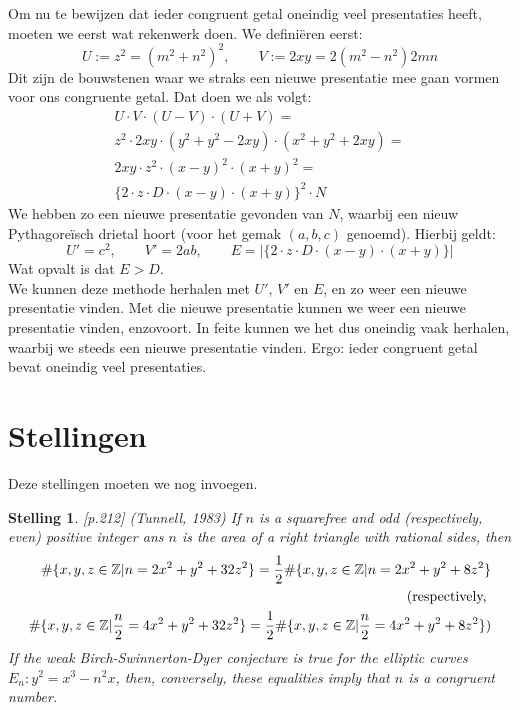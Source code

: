 \documentclass[12pt,reqno]{article}
\newcommand*{\ZZ}{\ensuremath{\mathbb{Z}}}
\theoremstyle{theorem}
\newtheorem{theorem}{Stelling}
\theoremstyle{definition}
\begin{document}
	Om nu te bewijzen dat ieder congruent getal oneindig veel presentaties heeft, moeten we eerst wat rekenwerk doen. We defini\"eren eerst:
	\begin{equation}
		U:= z^2=(m^2+n^2)^2, \qquad V:= 2xy=2(m^2-n^2)2mn
	\end{equation}
	Dit zijn de bouwstenen waar we straks een nieuwe presentatie mee gaan vormen voor ons congruente getal. Dat doen we als volgt:
	\begin{align}
			U\cdot V \cdot (U-V) \cdot (U+V)=\\
			z^2\cdot 2xy\cdot (y^2+y^2-2xy)\cdot (x^2+y^2+2xy)=\\
			2xy\cdot z^2\cdot (x-y)^2\cdot (x+y)^2=\\
			\{2\cdot z\cdot D\cdot (x-y)\cdot (x+y)\}^2\cdot N
	\end{align}
	We hebben zo een nieuwe presentatie gevonden van $N$, waarbij een nieuw Pythagore\"isch drietal hoort (voor het gemak $(a,b,c)$ genoemd). Hierbij geldt:
	\begin{equation}
		U'=c^2, \qquad V'=2ab, \qquad E=|\{2\cdot z\cdot D\cdot (x-y)\cdot (x+y)\}|
	\end{equation}
	Wat opvalt is dat $E>D$.\\
	
	We kunnen deze methode herhalen met $U'$, $V'$ en $E$, en zo weer een nieuwe presentatie vinden. Met die nieuwe presentatie kunnen we weer een nieuwe presentatie vinden, enzovoort. In feite kunnen we het dus oneindig vaak herhalen, waarbij we steeds een nieuwe presentatie vinden. Ergo: ieder congruent getal bevat oneindig veel presentaties.
	
	
	\section{Stellingen}
	{\color{red}Deze stellingen moeten we nog invoegen.}
	
	\begin{theorem}
		\cite{Koblitz}[p.212] (Tunnell, 1983) If $n$ is a squarefree and odd (respectively, even) positive integer ans $n$ is the area of a right triangle with rational sides, then
		\begin{align}
		\#\{x,y,z\in\ZZ|n=2x^2+y^2+32z^2\} = \frac{1}{2}\#\{x,y,z\in\ZZ|n=2x^2+y^2+8z^2\}\\
		\notag \text{(respectively, } \\
		\#\{x,y,z\in\ZZ|\frac{n}{2}=4x^2+y^2+32z^2\} = \frac{1}{2}\#\{x,y,z\in\ZZ|\frac{n}{2}=4x^2+y^2+8z^2\})
		\end{align}
		If the weak Birch-Swinnerton-Dyer conjecture is true for the elliptic curves $E_n:y^2=x^3-n^2x$, then, conversely, these equalities imply that $n$ is a congruent number.
	\end{theorem}
	
\end{document}
